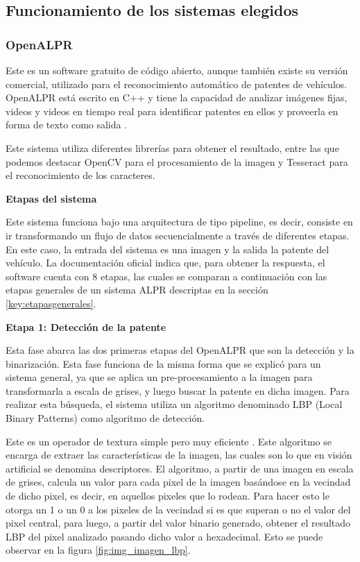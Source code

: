 \subsection{Funcionamiento de los sistemas elegidos}\label{key:funcsistelegidos}

\subsubsection{OpenALPR}
Este es un software gratuito de código abierto, aunque también existe su versión comercial, utilizado para el reconocimiento automático de patentes de vehículos. OpenALPR está escrito en C++ y tiene la capacidad de analizar  imágenes fijas, videos y videos en tiempo real para identificar patentes en ellos y proveerla en forma de texto como salida \cite{openalprdoc}. 

Este sistema utiliza diferentes librerías para obtener el resultado, entre las que podemos destacar OpenCV \cite{libreriaopencv} para el procesamiento de la imagen y Tesseract \cite{tesseractdoc} para el reconocimiento de los caracteres.


\noindent \textbf{Etapas del sistema}	
	
Este sistema funciona bajo una arquitectura de tipo pipeline, es decir, consiste en ir transformando un flujo de datos secuencialmente a través de diferentes etapas. En este caso, la entrada del sistema es una imagen y la salida la patente del vehículo.
La documentación oficial \cite{developersguide} indica que, para obtener la respuesta, el software cuenta con 8 etapas, las cuales se comparan a continuación con las etapas generales de un sistema ALPR descriptas en la sección \ref{key:etapasgenerales}.

\quad

\noindent \textbf{Etapa 1: Detección de la patente}

Esta fase abarca las dos primeras etapas del OpenALPR que son la detección y la binarización. Esta fase funciona de la misma forma que se explicó para un sistema general, ya que se aplica un pre-procesamiento a la imagen para transformarla a escala de grises, y luego buscar la patente en dicha imagen. Para realizar esta búsqueda, el sistema utiliza un algoritmo denominado LBP (Local Binary Patterns) como algoritmo de detección.

Este es un operador de textura simple pero muy eficiente \cite{lbpalgoritmo}. Este algoritmo se encarga de extraer las características de la imagen, las cuales son lo que en visión artificial se denomina descriptores. El algoritmo, a partir de una imagen en escala de grises, calcula un valor para cada pixel de la imagen basándose en la vecindad de dicho pixel, es decir, en aquellos pixeles que lo rodean. Para hacer esto le otorga un 1 o un 0 a los pixeles de la vecindad si es que superan o no el valor del pixel central, para luego, a partir del valor binario generado, obtener el resultado LBP del pixel analizado pasando dicho valor a hexadecimal. Esto se puede observar en la figura \ref{fig:img_imagen_lbp}.

